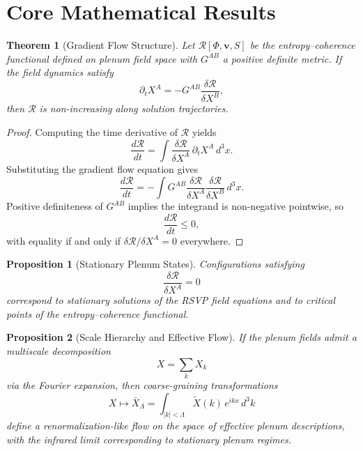 \documentclass[12pt,a4paper]{article}
\theoremstyle{plain}
\newtheorem{theorem}{Theorem}
\newtheorem{proposition}{Proposition}
\theoremstyle{definition}
\theoremstyle{remark}
\begin{document}
\section{Core Mathematical Results}
\label{app:theorems}

\begin{theorem}[Gradient Flow Structure]
\label{thm:gradient}
Let $\mathcal{R}[\Phi,\mathbf{v},S]$ be the entropy--coherence
functional defined on plenum field space with $G^{AB}$ a positive
definite metric. If the field dynamics satisfy
\begin{equation}
\partial_t X^A = -G^{AB}\frac{\delta \mathcal{R}}{\delta X^B},
\end{equation}
then $\mathcal{R}$ is non-increasing along solution trajectories.
\end{theorem}

\begin{proof}
Computing the time derivative of $\mathcal{R}$ yields
\begin{equation}
\frac{d\mathcal{R}}{dt} =
\int \frac{\delta \mathcal{R}}{\delta X^A}\,\partial_t X^A\, d^3x.
\end{equation}
Substituting the gradient flow equation gives
\begin{equation}
\frac{d\mathcal{R}}{dt} =
-\int G^{AB}
\frac{\delta \mathcal{R}}{\delta X^A}
\frac{\delta \mathcal{R}}{\delta X^B}\, d^3x.
\end{equation}
Positive definiteness of $G^{AB}$ implies the integrand is
non-negative pointwise, so
\begin{equation}
\frac{d\mathcal{R}}{dt} \leq 0,
\end{equation}
with equality if and only if $\delta\mathcal{R}/\delta X^A = 0$
everywhere.
\end{proof}

\begin{proposition}[Stationary Plenum States]
Configurations satisfying
\begin{equation}
\frac{\delta \mathcal{R}}{\delta X^A} = 0
\end{equation}
correspond to stationary solutions of the RSVP field equations and
to critical points of the entropy--coherence functional.
\end{proposition}

\begin{proposition}[Scale Hierarchy and Effective Flow]
If the plenum fields admit a multiscale decomposition
\begin{equation}
X = \sum_k X_k
\end{equation}
via the Fourier expansion, then coarse-graining transformations
\begin{equation}
X \mapsto \bar{X}_\Lambda = \int_{|k|<\Lambda}\tilde{X}(k)\,e^{ikx}\,d^3k
\end{equation}
define a renormalization-like flow on the space of effective plenum
descriptions, with the infrared limit corresponding to stationary
plenum regimes.
\end{proposition}
\end{document}
